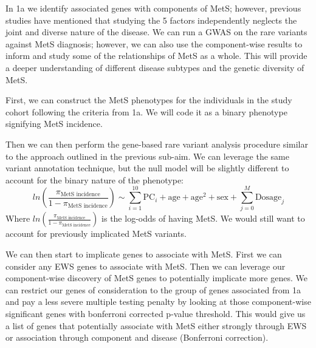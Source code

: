 \documentclass[11pt]{article}
\begin{document}
\noindent {}

In 1a we identify associated genes with components of MetS; however, previous studies have mentioned that studying the 5 factors independently neglects the joint and diverse nature of the disease. We can run a GWAS on the rare variants against MetS diagnosis; however, we can also use the component-wise results to inform and study some of the relationships of MetS as a whole. This will provide a deeper understanding of different disease subtypes and the genetic diversity of MetS.

\noindent {}

First, we can construct the MetS phenotypes for the individuals in the study cohort following the criteria from 1a. We will code it as a binary phenotype signifying MetS incidence.

Then we can then perform the gene-based rare variant analysis procedure similar to the approach outlined in the previous sub-aim. We can leverage the same variant annotation technique, but the null model will be slightly different to account for the binary nature of the phenotype:
$$ln(\frac{\pi_\text{MetS incidence}}{1-\pi_\text{MetS incidence}}) \sim \sum_{i=1}^{10} \text{PC}_i + \text{age} + \text{age}^2 + \text{sex} + \sum_{j=0}^{M}\text{Dosage}_j$$
Where $ln(\frac{\pi_\text{MetS incidence}}{1-\pi_\text{MetS incidence}})$ is the log-odds of having MetS. We would still want to account for previously implicated MetS variants. 

We can then start to implicate genes to associate with MetS. First we can consider any EWS genes to associate with MetS. Then we can leverage our component-wise discovery of MetS genes to potentially implicate more genes. We can restrict our genes of consideration to the group of genes associated from 1a and pay a less severe multiple testing penalty by looking at those component-wise significant genes with bonferroni corrected p-value threshold. This would give us a list of genes that potentially associate with MetS either strongly through EWS or association through component and disease (Bonferroni correction).
\end{document}
